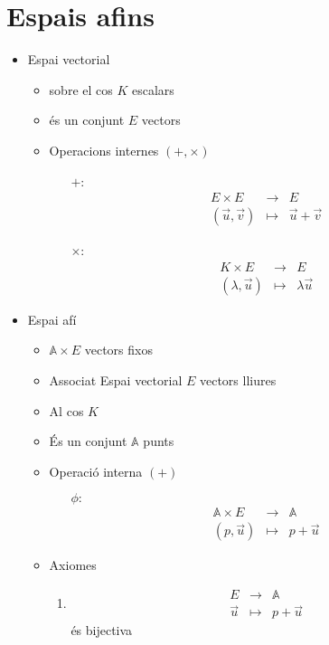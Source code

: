 \documentclass[a4paper,10pt]{article}
\newcommand{\blue}[1]{{\color{blue}#1}}
\newcommand{\red}[1]{{\color{red}#1}}
\newcommand{\A}{\mathbb{A}}
\begin{document}
\section{Espais afins}
\begin{itemize}
\item Espai vectorial
	\begin{itemize}
	\item \blue{sobre el} cos $K$ \red{escalars}
	\item \blue{és un} conjunt $E$ \red{vectors}
	\item Operacions internes $(+, \times)$
		\begin{itemize}
		\item[$+$:] $$	\begin{array}{rcl}
				E\times E		& \to		& E			\\
				(\vec{u}, \vec{v})	& \mapsto	& \vec{u} + \vec{v}
				\end{array}$$
		\item[$\times$:] $$	\begin{array}{rcl}
				K\times E		& \to		& E			\\
				(\lambda, \vec{u})	& \mapsto	& \lambda \vec{u}
				\end{array}$$
		\end{itemize}
	\end{itemize}
\item Espai afí
	\begin{itemize}
	\item $\A \times E$ \red{vectors fixos}
	\item \blue{Associat} Espai vectorial $E$ \red{vectors lliures}
	\item \blue{Al} cos $K$
	\item \blue{És un} conjunt $\A$ \red{punts}
	\item Operació interna $(+)$
		\begin{itemize}
		\item[$\phi:$] $$\begin{array}{rcl}
				\A \times E	& \to		& \A	\\
				(p, \vec{u})	& \mapsto	& p + \vec{u}
				\end{array}$$
		\end{itemize}
	\item Axiomes
		\begin{enumerate}
		\item $$\begin{array}{rcl}E&\to&\A\\\vec{u}&\mapsto&p+\vec{u}\end{array}$$ \blue{és} bijectiva

\end{enumerate}
\end{itemize}
\end{itemize}
\end{document}
